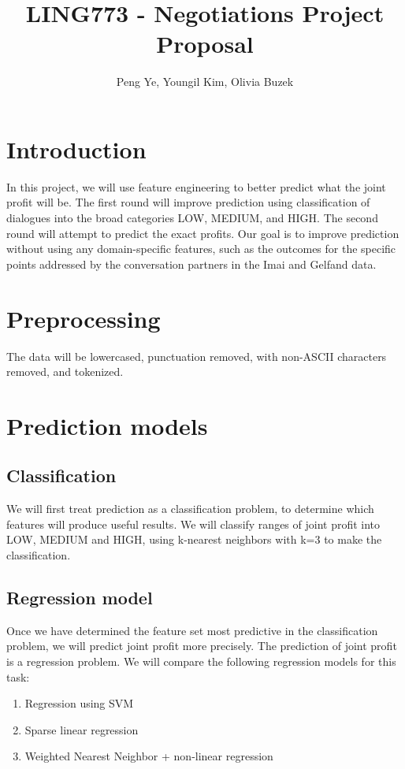 \documentclass[11pt]{article} %
\title{LING773 - Negotiations Project Proposal}
\author{Peng Ye, Youngil Kim, Olivia Buzek}
\begin{document}
\maketitle

\section{Introduction} %

In this project, we will use feature engineering to better predict what the joint profit will be.  The first round will improve prediction using classification of dialogues into the broad categories LOW, MEDIUM, and HIGH.  The second round will attempt to predict the exact profits.  Our goal is to improve prediction without using any domain-specific features, such as the outcomes for the specific points addressed by the conversation partners in the Imai and Gelfand data.

\section{Preprocessing} %

The data will be lowercased, punctuation removed, with non-ASCII characters removed, and tokenized.

\section{Prediction models}

\subsection{Classification}
We will first treat prediction as a classification problem, to determine which features will produce useful results.  We will classify ranges of joint profit into LOW, MEDIUM and HIGH, using k-nearest neighbors with k=3 to make the classification.

\subsection{Regression model}  %
Once we have determined the feature set most predictive in the classification problem, we will predict joint profit more precisely.  The prediction of joint profit is a regression problem. We will compare the following regression models for this task:
\begin{enumerate}
\item Regression using SVM
\item Sparse linear regression
\item Weighted Nearest Neighbor + non-linear regression
\end{enumerate}
\end{document}
